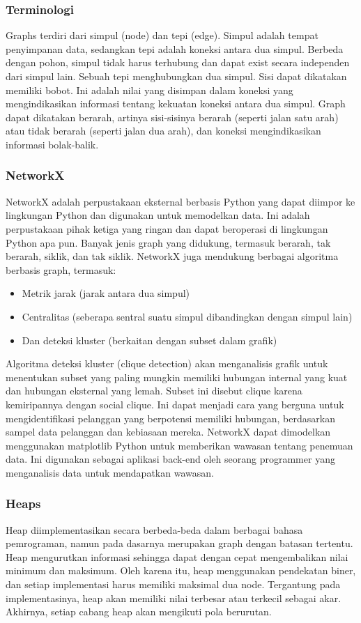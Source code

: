 \documentclass{article}
\begin{document}
\subsubsection{Terminologi}
Graphs terdiri dari simpul (node) dan tepi (edge). Simpul adalah tempat penyimpanan data, sedangkan tepi adalah koneksi antara dua simpul. Berbeda dengan pohon, simpul tidak harus terhubung dan dapat exist secara independen dari simpul lain. Sebuah tepi menghubungkan dua simpul. Sisi dapat dikatakan memiliki bobot. Ini adalah nilai yang disimpan dalam koneksi yang mengindikasikan informasi tentang kekuatan koneksi antara dua simpul. Graph dapat dikatakan berarah, artinya sisi-sisinya berarah (seperti jalan satu arah) atau tidak berarah (seperti jalan dua arah), dan koneksi mengindikasikan informasi bolak-balik.

\subsubsection{NetworkX}
NetworkX adalah perpustakaan eksternal berbasis Python yang dapat diimpor ke lingkungan Python dan digunakan untuk memodelkan data. Ini adalah perpustakaan pihak ketiga yang ringan dan dapat beroperasi di lingkungan Python apa pun. Banyak jenis graph yang didukung, termasuk berarah, tak berarah, siklik, dan tak siklik. NetworkX juga mendukung berbagai algoritma berbasis graph, termasuk:
\begin{itemize}
    \item Metrik jarak (jarak antara dua simpul)
    \item Centralitas (seberapa sentral suatu simpul dibandingkan dengan simpul lain)
    \item Dan deteksi kluster (berkaitan dengan subset dalam grafik)
\end{itemize}

Algoritma deteksi kluster (clique detection) akan menganalisis grafik untuk menentukan subset yang paling mungkin memiliki hubungan internal yang kuat dan hubungan eksternal yang lemah. Subset ini disebut clique karena kemiripannya dengan social clique. Ini dapat menjadi cara yang berguna untuk mengidentifikasi pelanggan yang berpotensi memiliki hubungan, berdasarkan sampel data pelanggan dan kebiasaan mereka. NetworkX dapat dimodelkan menggunakan matplotlib Python untuk memberikan wawasan tentang penemuan data. Ini digunakan sebagai aplikasi back-end oleh seorang programmer yang menganalisis data untuk mendapatkan wawasan.

\subsubsection{Heaps}
Heap diimplementasikan secara berbeda-beda dalam berbagai bahasa pemrograman, namun pada dasarnya merupakan graph dengan batasan tertentu. Heap mengurutkan informasi sehingga dapat dengan cepat mengembalikan nilai minimum dan maksimum. Oleh karena itu, heap menggunakan pendekatan biner, dan setiap implementasi harus memiliki maksimal dua node. Tergantung pada implementasinya, heap akan memiliki nilai terbesar atau terkecil sebagai akar. Akhirnya, setiap cabang heap akan mengikuti pola berurutan.
\end{document}
